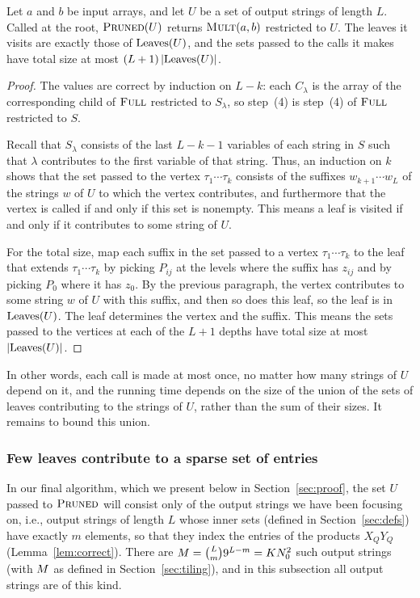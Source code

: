 \begin{lemma}\label{lem:prune}
Let $a$ and $b$ be input arrays, and let $U$ be a set of output strings of length $L$. Called at the root, $\textnormal{\textsc{Pruned}}(U)$ returns $\textnormal{\textsc{Mult}}(a,b)$ restricted to $U$. The leaves it visits are exactly those of $\mathrm{Leaves}(U)$, and the sets passed to the calls it makes have total size at most $(L+1)\,|\mathrm{Leaves}(U)|$.
\end{lemma}

\begin{proof}
The values are correct by induction on $L-k$: each $C_\lambda$ is the array of the corresponding child of $\textnormal{\textsc{Full}}$ restricted to $S_\lambda$, so step~(4) is step~(4) of $\textnormal{\textsc{Full}}$ restricted to $S$.

Recall that $S_\lambda$ consists of the last $L-k-1$ variables of each string in $S$ such that $\lambda$ contributes to the first variable of that string. Thus, an induction on $k$ shows that the set passed to the vertex $\tau_1\cdots\tau_k$ consists of the suffixes $w_{k+1}\cdots w_L$ of the strings $w$ of $U$ to which the vertex contributes, and furthermore that the vertex is called if and only if this set is nonempty. This means a leaf is visited if and only if it contributes to some string of $U$.

For the total size, map each suffix in the set passed to a vertex $\tau_1\cdots\tau_k$ to the leaf that extends $\tau_1\cdots\tau_k$ by picking $P_{ij}$ at the levels where the suffix has $z_{ij}$ and by picking $P_0$ where it has $z_0$. By the previous paragraph, the vertex contributes to some string $w$ of $U$ with this suffix, and then so does this leaf, so the leaf is in $\mathrm{Leaves}(U)$. The leaf determines the vertex and the suffix. This means the sets passed to the vertices at each of the $L+1$ depths have total size at most $|\mathrm{Leaves}(U)|$.
\end{proof}

In other words, each call is made at most once, no matter how many strings of $U$ depend on it, and the running time depends on the size of the union of the sets of leaves contributing to the strings of $U$, rather than the sum of their sizes. It remains to bound this union.

\subsubsection{Few leaves contribute to a sparse set of entries}\label{sec:counts}

In our final algorithm, which we present below in Section~\ref{sec:proof}, the set $U$ passed to $\textnormal{\textsc{Pruned}}$ will consist only of the output strings we have been focusing on, i.e., output strings of length $L$ whose inner sets (defined in Section~\ref{sec:defs}) have exactly $m$ elements, so that they index the entries of the products $X_QY_Q$ (Lemma~\ref{lem:correct}). There are $M=\binom Lm9^{L-m}=KN_0^2$ such output strings (with $M$ as defined in Section~\ref{sec:tiling}), and in this subsection all output strings are of this kind.


